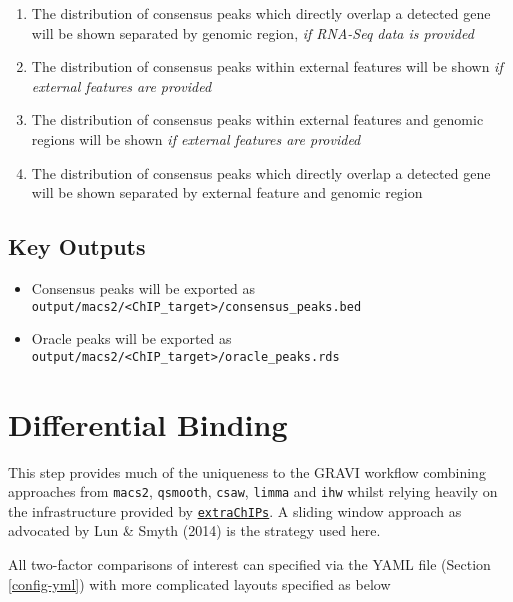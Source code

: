 \documentclass[
]{book}
\providecommand{\tightlist}{%
  \setlength{\itemsep}{0pt}\setlength{\parskip}{0pt}}
\begin{document}
\begin{enumerate}
\def\labelenumi{\arabic{enumi}.}
\tightlist
\item
  The distribution of consensus peaks which directly overlap a detected gene will be shown separated by genomic region, \emph{if RNA-Seq data is provided}
\item
  The distribution of consensus peaks within external features will be shown \emph{if external features are provided}
\item
  The distribution of consensus peaks within external features and genomic regions will be shown \emph{if external features are provided}
\item
  The distribution of consensus peaks which directly overlap a detected gene will be shown separated by external feature and genomic region
\end{enumerate}

\hypertarget{key-outputs}{%
\subsection*{Key Outputs}\label{key-outputs}}

\begin{itemize}
\tightlist
\item
  Consensus peaks will be exported as \texttt{output/macs2/\textless{}ChIP\_target\textgreater{}/consensus\_peaks.bed}
\item
  Oracle peaks will be exported as \texttt{output/macs2/\textless{}ChIP\_target\textgreater{}/oracle\_peaks.rds}
\end{itemize}

\hypertarget{differential-binding}{%
\section{Differential Binding}\label{differential-binding}}

This step provides much of the uniqueness to the GRAVI workflow combining approaches from \texttt{macs2}\citep{macs2}, \texttt{qsmooth}\citep{qsmooth}, \texttt{csaw}\citep{csaw}, \texttt{limma}\citep{limma} and \texttt{ihw}\citep{ihw} whilst relying heavily on the infrastructure provided by \href{https://bioconductor.org/packages/release/bioc/html/extraChIPs.html}{\texttt{extraChIPs}}.
A sliding window approach as advocated by Lun \& Smyth (2014) is the strategy used here.

All two-factor comparisons of interest can specified via the YAML file (Section \ref{config-yml}) with more complicated layouts specified as below
\end{document}
